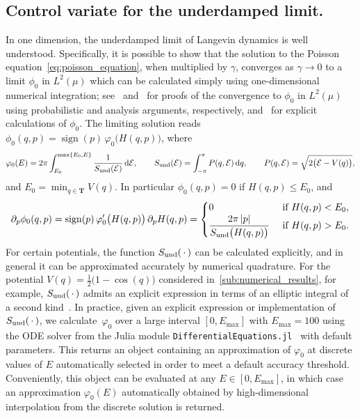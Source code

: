 \documentclass[11pt,a4paper]{article}
\DeclareMathOperator{\sign}{sign}
\newcommand{\dummy}{\,\cdot\,}
\newcommand{\torus}{\mathbf T}
\renewcommand{\d}{\mathrm d}
\theoremstyle{plain}
\numberwithin{equation}{section}
\renewcommand{\leq}{\leqslant}
\begin{document}
\subsection{Control variate for the underdamped limit.}%
\label{sub:underdamped_approach}
In one dimension,
the underdamped limit of Langevin dynamics is well understood.
Specifically, it is possible to show that the solution to the Poisson equation~\eqref{eq:poisson_equation},
when multiplied by $\gamma$,
converges as $\gamma \to 0$ to a limit $\phi_0$ in $L^2(\mu)$ which can be calculated simply using one-dimensional numerical integration;
see~\cite[Lemma 3.4]{MR2394704} and~\cite[Proposition 4.1]{roussel_thesis}
for proofs of the convergence to $\phi_0$ in $L^2(\mu)$ using probabilistic and analysis arguments,
respectively,
and~\cite{MR2427108} for explicit calculations of $\phi_0$.
The limiting solution reads $\phi_0(q,p) = \sign(p) \, \varphi_0\bigl(H(q,p)\bigr)$,
where
\[
    \varphi_0(E) = 2 \pi \int_{E_0}^{\max\{E_0, E\}} \frac{1}{S_{\rm und}(\mathcal E)} \, \d \mathcal E,
    \qquad S_{\rm und}(\mathcal E) = \int_{-\pi}^{\pi} P(q, \mathcal E) \, \d q, \qquad P(q, \mathcal E) = \sqrt {2 \bigl(\mathcal E - V(q)\bigr)},
\]
and $E_0 = \min_{q \in \torus} V(q)$.
In particular $\phi_0(q,p) = 0$ if $H(q,p) \leq E_0$,
and
\[
    \partial_p \phi_0(q, p)
    = \sign(p) \, \varphi_0'\bigl(H(q,p)\bigr) \, \partial_p H(q,p)
    =
    \begin{cases}
        0 & \text{ if $H(q,p) < E_0$}, \\
        \displaystyle \frac{2 \pi \abs{p}}{S_{\rm und}\bigl(H(q,p)\bigr)} & \text{ if $H(q,p) > E_0$}.
    \end{cases}
\]
For certain potentials,
the function $S_{\rm und}(\dummy)$ can be calculated explicitly,
and in general it can be approximated accurately by numerical quadrature.
For the potential $V(q) = \frac{1}{2} \bigl(1 - \cos(q)\bigr)$ considered in~\cref{sub:numerical_results},
for example, $S_{\rm und}(\dummy)$ admits an explicit expression in terms of an elliptic integral of a second kind~\cite{MR2427108}.
In practice, given an explicit expression or implementation of~$S_{\rm und}(\dummy)$,
we calculate~$\varphi_0$ over a large interval $[0, E_{\max}]$ with $E_{\max} = 100$
using the ODE solver from the Julia module \texttt{DifferentialEquations.jl}~\cite{rackauckas2017differentialequations} with default parameters.
This returns an object containing an approximation of $\varphi_0$ at discrete values of $E$ automatically selected in order to meet a default accuracy threshold.
Conveniently, this object can be evaluated at any $E \in [0, E_{\max}]$,
in which case an approximation $\varphi_0(E)$ automatically obtained by high-dimensional interpolation from the discrete solution is returned.
\end{document}
